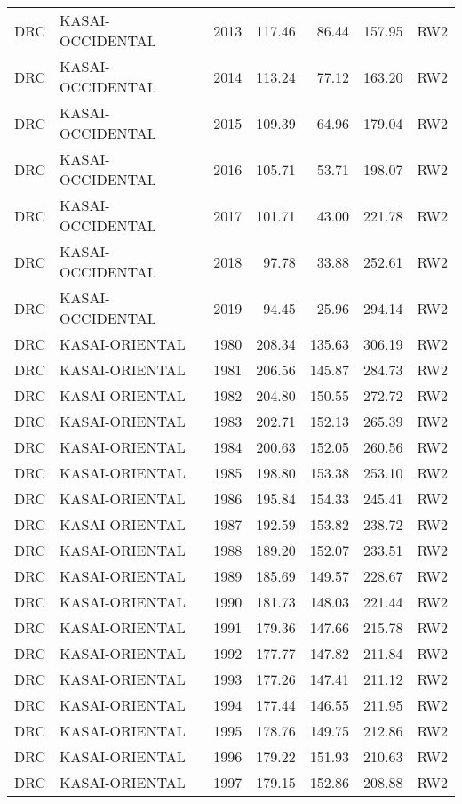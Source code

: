\begin{longtable}{lllrrrl}
  DRC & KASAI-OCCIDENTAL & 2013 & 117.46 & 86.44 & 157.95 & RW2 \\ 
  DRC & KASAI-OCCIDENTAL & 2014 & 113.24 & 77.12 & 163.20 & RW2 \\ 
  DRC & KASAI-OCCIDENTAL & 2015 & 109.39 & 64.96 & 179.04 & RW2 \\ 
  DRC & KASAI-OCCIDENTAL & 2016 & 105.71 & 53.71 & 198.07 & RW2 \\ 
  DRC & KASAI-OCCIDENTAL & 2017 & 101.71 & 43.00 & 221.78 & RW2 \\ 
  DRC & KASAI-OCCIDENTAL & 2018 & 97.78 & 33.88 & 252.61 & RW2 \\ 
  DRC & KASAI-OCCIDENTAL & 2019 & 94.45 & 25.96 & 294.14 & RW2 \\ 
  DRC & KASAI-ORIENTAL & 1980 & 208.34 & 135.63 & 306.19 & RW2 \\ 
  DRC & KASAI-ORIENTAL & 1981 & 206.56 & 145.87 & 284.73 & RW2 \\ 
  DRC & KASAI-ORIENTAL & 1982 & 204.80 & 150.55 & 272.72 & RW2 \\ 
  DRC & KASAI-ORIENTAL & 1983 & 202.71 & 152.13 & 265.39 & RW2 \\ 
  DRC & KASAI-ORIENTAL & 1984 & 200.63 & 152.05 & 260.56 & RW2 \\ 
  DRC & KASAI-ORIENTAL & 1985 & 198.80 & 153.38 & 253.10 & RW2 \\ 
  DRC & KASAI-ORIENTAL & 1986 & 195.84 & 154.33 & 245.41 & RW2 \\ 
  DRC & KASAI-ORIENTAL & 1987 & 192.59 & 153.82 & 238.72 & RW2 \\ 
  DRC & KASAI-ORIENTAL & 1988 & 189.20 & 152.07 & 233.51 & RW2 \\ 
  DRC & KASAI-ORIENTAL & 1989 & 185.69 & 149.57 & 228.67 & RW2 \\ 
  DRC & KASAI-ORIENTAL & 1990 & 181.73 & 148.03 & 221.44 & RW2 \\ 
  DRC & KASAI-ORIENTAL & 1991 & 179.36 & 147.66 & 215.78 & RW2 \\ 
  DRC & KASAI-ORIENTAL & 1992 & 177.77 & 147.82 & 211.84 & RW2 \\ 
  DRC & KASAI-ORIENTAL & 1993 & 177.26 & 147.41 & 211.12 & RW2 \\ 
  DRC & KASAI-ORIENTAL & 1994 & 177.44 & 146.55 & 211.95 & RW2 \\ 
  DRC & KASAI-ORIENTAL & 1995 & 178.76 & 149.75 & 212.86 & RW2 \\ 
  DRC & KASAI-ORIENTAL & 1996 & 179.22 & 151.93 & 210.63 & RW2 \\ 
  DRC & KASAI-ORIENTAL & 1997 & 179.15 & 152.86 & 208.88 & RW2 \\ 

\end{longtable}
